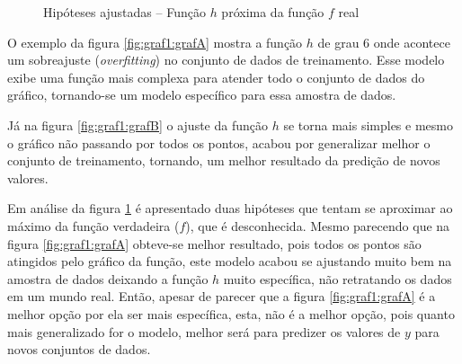  \begin{figure}[h!]
    \centering
    \quad
    
    \caption{Hipóteses ajustadas – Função ${h}$ próxima da função ${f}$ real} \label{fig:graf1}
        
\end{figure}


O exemplo da figura \ref{fig:graf1:grafA} mostra a função ${h}$  de grau 6 onde acontece um sobreajuste (\textit{overfitting}) no conjunto de dados de treinamento. Esse modelo exibe uma função mais complexa para atender todo o conjunto de dados do gráfico, tornando-se um modelo específico para essa amostra de dados. 

Já na figura \ref{fig:graf1:grafB} o ajuste da função ${h}$ se torna mais simples e mesmo o gráfico não passando por todos os pontos, acabou por generalizar melhor o conjunto de treinamento, tornando, um melhor resultado da predição de novos valores. 

Em análise da figura \ref{fig:graf1} é apresentado duas hipóteses que tentam se aproximar ao máximo da função verdadeira (${f}$), que é desconhecida. Mesmo parecendo que na figura \ref{fig:graf1:grafA} obteve-se melhor resultado, pois todos os pontos são atingidos pelo gráfico da função, este modelo acabou se ajustando muito bem na amostra de dados deixando a função ${h}$ muito específica, não retratando os dados em um mundo real. Então,  apesar de parecer que a figura \ref{fig:graf1:grafA} é a melhor opção por ela ser mais específica, esta, não é a melhor opção, pois quanto mais generalizado for o modelo, melhor será para predizer os valores de ${y}$ para novos conjuntos de dados.

